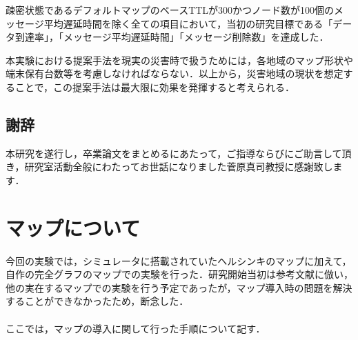 \documentclass[11pt]{icsthesis}
\begin{document}
疎密状態であるデフォルトマップのベースTTLが300かつノード数が100個のメッセージ平均遅延時間を除く全ての項目において，当初の研究目標である「データ到達率」，「メッセージ平均遅延時間」「メッセージ削除数」を達成した．

本実験における提案手法を現実の災害時で扱うためには，各地域のマップ形状や端末保有台数等を考慮しなければならない．以上から，災害地域の現状を想定することで，この提案手法は最大限に効果を発揮すると考えられる．


\clearpage
\fancyhead[L]{}\fancyhead[R]{}
\renewcommand{\headrulewidth}{0truemm}
\section*{謝辞}
本研究を遂行し，卒業論文をまとめるにあたって，ご指導ならびにご助言して頂き，研究室活動全般にわたってお世話になりました菅原真司教授に感謝致します．

\clearpage
\nocite{*}

\fancyhead[L]{\nouppercase{\small\leftmark}}\fancyhead[R]{}
\renewcommand{\headrulewidth}{0.3truemm}


\clearpage
\fancyhead[L]{\nouppercase{\small\leftmark}}
\fancyhead[R]{\nouppercase{\small\rightmark}}
\fancyfoot[C]{--\ \thepage\ --}
\renewcommand{\headrulewidth}{0.3truemm}
\appendix
\chapter{マップについて}
今回の実験では，シミュレータに搭載されていたヘルシンキのマップに加えて，自作の完全グラフのマップでの実験を行った．研究開始当初は参考文献に倣い，他の実在するマップでの実験を行う予定であったが，マップ導入時の問題を解決することができなかったため，断念した．\\\\
ここでは，マップの導入に関して行った手順について記す．
\end{document}
